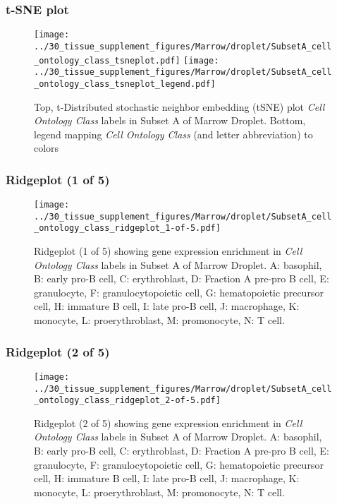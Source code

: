 \clearpage
\subsubsection{t-SNE plot}
\begin{figure}[h]
\centering
\texttt{[image: ../30\_tissue\_supplement\_figures/Marrow/droplet/SubsetA\_cell\_ontology\_class\_tsneplot.pdf]}
\texttt{[image: ../30\_tissue\_supplement\_figures/Marrow/droplet/SubsetA\_cell\_ontology\_class\_tsneplot\_legend.pdf]}
\caption{Top, t-Distributed stochastic neighbor embedding (tSNE) plot  \emph{Cell Ontology Class} labels in Subset A of Marrow Droplet. Bottom, legend mapping \emph{Cell Ontology Class} (and letter abbreviation) to colors}
\end{figure}


\clearpage

\subsubsection{Ridgeplot (1 of 5)}
\begin{figure}[h]
\centering
\texttt{[image: ../30\_tissue\_supplement\_figures/Marrow/droplet/SubsetA\_cell\_ontology\_class\_ridgeplot\_1-of-5.pdf]}

\caption{ Ridgeplot (1 of 5)  showing gene expression enrichment in \emph{Cell Ontology Class} labels in Subset A of Marrow Droplet. A: basophil, B: early pro-B cell, C: erythroblast, D: Fraction A pre-pro B cell, E: granulocyte, F: granulocytopoietic cell, G: hematopoietic precursor cell, H: immature B cell, I: late pro-B cell, J: macrophage, K: monocyte, L: proerythroblast, M: promonocyte, N: T cell.}
\end{figure}


\clearpage

\subsubsection{Ridgeplot (2 of 5)}
\begin{figure}[h]
\centering
\texttt{[image: ../30\_tissue\_supplement\_figures/Marrow/droplet/SubsetA\_cell\_ontology\_class\_ridgeplot\_2-of-5.pdf]}

\caption{ Ridgeplot (2 of 5)  showing gene expression enrichment in \emph{Cell Ontology Class} labels in Subset A of Marrow Droplet. A: basophil, B: early pro-B cell, C: erythroblast, D: Fraction A pre-pro B cell, E: granulocyte, F: granulocytopoietic cell, G: hematopoietic precursor cell, H: immature B cell, I: late pro-B cell, J: macrophage, K: monocyte, L: proerythroblast, M: promonocyte, N: T cell.}
\end{figure}


